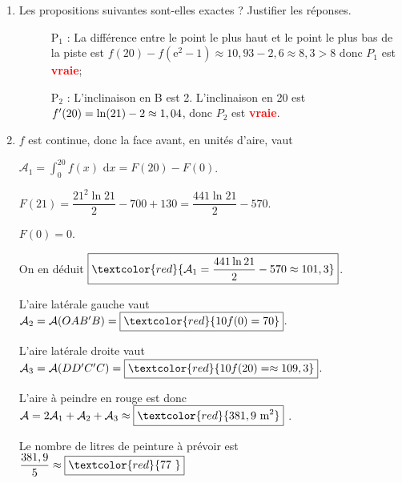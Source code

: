 \documentclass[12pt]{article}
\begin{document}
\begin{enumerate}
\item Les propositions suivantes sont-elles exactes ? Justifier les réponses.

\setlength\parindent{9mm}
\begin{description}
\item[ ] P$_1$ : %
La différence entre le point le plus haut et le point le plus bas de la piste est $f(20)-f\left(\mathrm{e}^{2}-1\right)\approx 10,93-2,6\approx 8,3>8$ donc $P_1$ est \textbf{\textcolor{red}{vraie}};

\item[ ] P$_2$ : %
L'inclinaison en B est 2. L'inclinaison en 20 est $f'(20)=\ln(21)-2\\
\approx 1,04$, donc $P_2$ est \textbf{\textcolor{red}{vraie}}.
\end{description}
\setlength\parindent{0mm}

\item %

$f$ est continue, donc la face avant, en unités d'aire, vaut 

\noindent $\mathcal{A}_1=\int_0^{20}f(x)\text{ d}x=F(20)-F(0)$.

\noindent $F(21)=\dfrac{21^2\ln 21}{2}-700+130=\dfrac{441\ln 21}{2}-570$.

\noindent $F(0)=0$.

\noindent On en déduit $\boxed{\textcolor{red}{\mathcal{A}_1=\dfrac{441\ln 21}{2}-570\approx 101,3}}$.

\noindent L'aire latérale gauche vaut $\mathcal{A}_2=\mathcal{A}(OAB'B)=\boxed{\textcolor{red}{10f(0)=70}}$.

\noindent L'aire latérale droite vaut $\mathcal{A}_3=\mathcal{A}(DD'C'C)=\boxed{\textcolor{red}{10f(20)=\approx 109,3}}$.

L'aire à peindre en rouge est donc $\mathcal{A}=2\mathcal{A}_1+\mathcal{A}_2+\mathcal{A}_3\approx \boxed{\textcolor{red}{381,9~\text{m}^2}}$ .

\noindent Le nombre de litres de peinture à prévoir est $\dfrac{381,9}{5}\approx \boxed{\textcolor{red}{77~}}$ 
\medskip


\end{enumerate}
\end{document}

